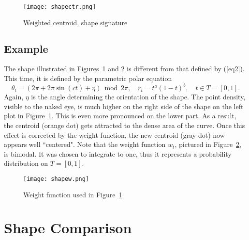 \documentclass[oneside,10pt]{book}
\begin{document}
\begin{figure}%
\centering
\texttt{[image: shapectr.png]} %
\caption{Weighted centroid, shape signature}
\label{fig:ctr}
\end{figure}


\subsection{Example}

The shape illustrated in Figures~\ref{fig:ctr} and \ref{fig:3b} is different from that defined by (\ref{eq2}). This time, it is defined by the parametric polar equation
\begin{equation}
\theta_t=(2\pi + 2\pi \sin(ct)+\eta)\bmod{2\pi},\quad r_t=t^a(1-t)^b, \quad t \in T=[0, 1]. \label{eq2b}
\end{equation}
Again, $\eta$ is the angle determining the orientation of the shape. The point density, visible to the naked eye, is much higher on the right side of the shape on the left plot in Figure~\ref{fig:ctr}. This is even more pronounced on the lower part. As a result, the centroid (orange dot) gets attracted to the dense area of the curve. Once this effect is corrected by the weight function, the new centroid (gray dot) now appears well ``centered". Note that the weight function $w_t$, pictured in Figure~\ref{fig:3b}, is bimodal. It was chosen to integrate to one, thus it represents a probability distribution on
$T=[0, 1]$.

\begin{figure}%
\centering
\texttt{[image: shapew.png]}  %
\caption{Weight function used in Figure~\ref{fig:ctr}}
\label{fig:3b}
\end{figure}


\section{Shape Comparison}\label{s4}
\end{document}
